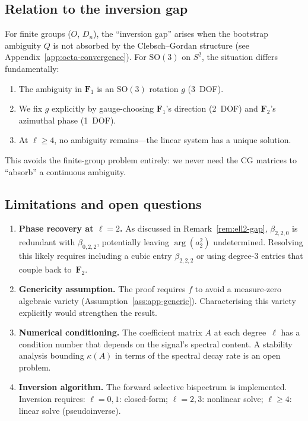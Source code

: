 \documentclass{article}
\newcommand{\SO}{\mathrm{SO}}
\begin{document}
\subsection{Relation to the inversion gap}

For finite groups ($O$, $D_n$), the ``inversion gap'' arises when the
bootstrap ambiguity $Q$ is not absorbed by the Clebsch--Gordan
structure (see Appendix~\ref{app:octa-convergence}). For $\SO(3)$ on
$S^2$, the situation differs fundamentally:
\begin{enumerate}[nosep]
  \item The ambiguity in $\mathbf{F}_1$ is an $\SO(3)$ rotation $g$
    (3~DOF).
  \item We fix $g$ explicitly by gauge-choosing $\mathbf{F}_1$'s
    direction (2~DOF) and $\mathbf{F}_2$'s azimuthal phase (1~DOF).
  \item At $\ell \ge 4$, no ambiguity remains---the linear system has
    a unique solution.
\end{enumerate}
This avoids the finite-group problem entirely: we never need the CG
matrices to ``absorb'' a continuous ambiguity.

\subsection{Limitations and open questions}

\begin{enumerate}
  \item \textbf{Phase recovery at $\ell = 2$.}
    As discussed in Remark~\ref{rem:ell2-gap}, $\beta_{2,2,0}$ is
    redundant with $\beta_{0,2,2}$, potentially leaving $\arg(a_2^2)$
    undetermined. Resolving this likely requires including a cubic entry
    $\beta_{2,2,2}$ or using degree-$3$ entries that couple back
    to~$\mathbf{F}_2$.

  \item \textbf{Genericity assumption.}
    The proof requires $f$ to avoid a measure-zero algebraic variety
    (Assumption~\ref{ass:app-generic}). Characterising this variety
    explicitly would strengthen the result.

  \item \textbf{Numerical conditioning.}
    The coefficient matrix $A$ at each degree~$\ell$ has a condition
    number that depends on the signal's spectral content. A stability
    analysis bounding $\kappa(A)$ in terms of the spectral decay rate
    is an open problem.

  \item \textbf{Inversion algorithm.}
    The forward selective bispectrum is implemented. Inversion requires:
    $\ell = 0, 1$: closed-form; $\ell = 2, 3$: nonlinear solve;
    $\ell \ge 4$: linear solve (pseudoinverse).
\end{enumerate}
\end{document}
